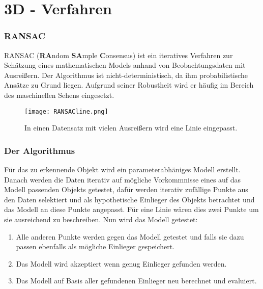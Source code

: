 
\chapter{3D - Verfahren}
\label{chap:3d}
\subsection{RANSAC}
RANSAC (\textbf{RA}ndom \textbf{SA}mple \textbf{C}onsensus) ist ein iteratives Verfahren zur Schätzung eines mathematischen Models anhand von Beobachtungsdaten mit Ausreißern. Der Algorithmus ist nicht-deterministisch, da ihm probabilistische Ansätze zu Grund liegen. Aufgrund seiner Robustheit wird er häufig im Bereich des maschinellen Sehens eingesetzt. 

\begin{figure}[H]
  \begin{center}
    \texttt{[image: RANSACline.png]}
    \caption{In einen Datensatz mit vielen Ausreißern wird eine Linie eingepasst.}
    \label{fig:ransac1}
  \end{center}
\end{figure}

\subsection{Der Algorithmus}
 Für das zu erkennende Objekt wird ein parameterabhäniges Modell erstellt. Danach werden die Daten iterativ auf mögliche Vorkommnisse eines auf das Modell passenden Objekts getestet, dafür werden iterativ zufällige Punkte aus den Daten selektiert und als hypothetische Einlieger des Objekts betrachtet und das Modell an diese Punkte angepasst. Für eine Linie wären dies zwei Punkte um sie ausreichend zu beschreiben. Nun wird das Modell getestet:

\begin{enumerate}
\item Alle anderen Punkte werden gegen das Modell getestet und falls sie dazu passen ebenfalls als mögliche Einlieger gespeichert.
\item Das Modell wird akzeptiert wenn genug Einlieger gefunden werden.
\item Das Modell auf Basis aller gefundenen Einlieger neu berechnet und evaluiert.
\end{enumerate}

